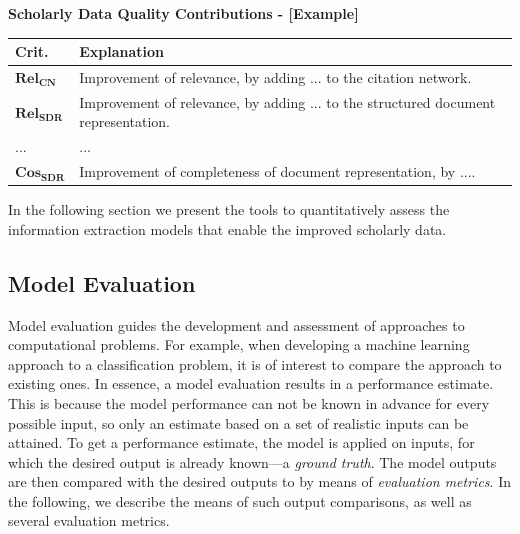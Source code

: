 \begin{infobox-progress}
      \textbf{Scholarly Data Quality Contributions - [Example]}\vspace{0.5em}

      \begin{tabular}{lp{10.9cm}}
        \toprule
        Crit. & Explanation \\
        \midrule
        $\mathbf{Rel_{CN}}$ & Improvement of relevance, by adding ... to the citation network. \\
        $\mathbf{Rel_{SDR}}$ & Improvement of relevance, by adding ... to the structured document representation. \\
        ... & ... \\
        $\mathbf{Cos_{SDR}}$ & Improvement of completeness of document representation, by .... \\
        \bottomrule
      \end{tabular}

\end{infobox-progress}

In the following section we present the tools to quantitatively assess the information extraction models that enable the improved scholarly data.

\subsection{Model Evaluation}

Model evaluation guides the development and assessment of approaches to computational problems. For example, when developing a machine learning approach to a classification problem, it is of interest to compare the approach to existing ones. In essence, a model evaluation results in a performance estimate. This is because the model performance can not be known in advance for every possible input, so only an estimate based on a set of realistic inputs can be attained.
To get a performance estimate, the model is applied on inputs, for which the desired output is already known---a \emph{ground truth}. The model outputs are then compared with the desired outputs to by means of \emph{evaluation metrics}. In the following, we describe the means of such output comparisons, as well as several evaluation metrics.

